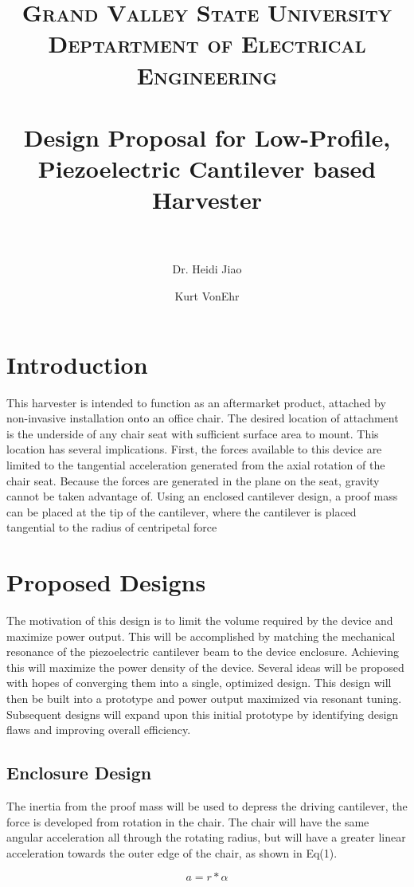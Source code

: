 \documentclass[paper=letter, fontsize=12pt]{scrartcl}
\title{
		\usefont{OT1}{bch}{b}{n}
		\normalfont \normalsize \textsc{Grand Valley State University} \\
        \normalfont \normalsize \textsc{Deptartment of Electrical Engineering} \\[20pt]
		\horrule{0.5pt} \\[0.4cm]
		\huge Design Proposal for Low-Profile, Piezoelectric Cantilever based Harvester  \\
		\horrule{1pt} \\[0.4cm]
}
\author[1]{Dr. Heidi Jiao}
\author[2]{Kurt VonEhr}
\affil[1]{Professor of Electrical Engineering, Grand Valley State University}
\affil[2]{Undergraduate Research Assistant, Grand Valley State University}
\begin{document}
\maketitle
\section{Introduction}

This harvester is intended to function as an aftermarket product, attached by non-invasive installation onto an office chair. The desired location of attachment is the underside of any chair seat with sufficient surface area to mount. This location has several implications. First, the forces available to this device are limited to the tangential acceleration generated from the axial rotation of the chair seat. Because the forces are generated in the plane on the seat, gravity cannot be taken advantage of. Using an enclosed cantilever design, a proof mass can be placed at the tip of the cantilever, where the cantilever is placed tangential to the radius of centripetal force 

\section{Proposed Designs}

The motivation of this design is to limit the volume required by the device and  maximize power output. This will be accomplished by matching the mechanical resonance of the piezoelectric cantilever beam to the device enclosure. Achieving this will maximize the power density of the device. Several ideas will be proposed with hopes of converging them into a single, optimized design. This design will then be built into a prototype and power output maximized via resonant tuning. Subsequent designs will expand upon this initial prototype by identifying design flaws and improving overall efficiency.

\subsection{Enclosure Design}

The inertia from the proof mass will be used to depress the driving cantilever, the force is developed from rotation in the chair. The chair will have the same angular acceleration all through the rotating radius, but will have a greater linear acceleration towards the outer edge of the chair, as shown in Eq(1).

\begin{equation}
a = r * \alpha
\end{equation}
\end{document}
